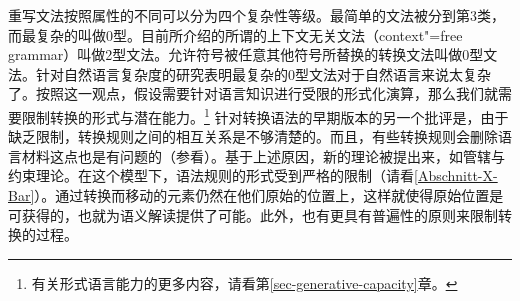重写文法按照属性的不同可以分为四个复杂性等级。最简单的文法被分到第3类，而最复杂的叫做0型。目前所介绍的所谓的上下文无关文法（context"=free grammar）叫做2型文法。允许符号被任意其他符号所替换的转换文法叫做0型文法\citep{PR73a-u}。\label{page-TG-Typ0}针对自然语言复杂度的研究表明最复杂的0型文法对于自然语言来说太复杂了。按照这一观点，假设需要针对语言知识进行受限的形式化演算\citep[]{Chomsky65a}，那么我们就需要限制转换的形式与潜在能力。\footnote{%
    有关形式语言能力的更多内容，请看第\ref{sec-generative-capacity}章。
} 
针对转换语法的早期版本的另一个批评是，由于缺乏限制，转换规则之间的相互关系是不够清楚的。而且，有些转换规则会删除语言材料这点也是有问题的（参看\citealp[\S~3.1.4]{Klenk2003a}）。基于上述原因，新的理论被提出来，如管辖与约束理论\citep{Chomsky81a}。在这个模型下，语法规则的形式受到严格的限制（请看\ref{Abschnitt-X-Bar}）。通过转换而移动的元素仍然在他们原始的位置上，这样就使得原始位置是可获得的，也就为语义解读提供了可能。此外，也有更具有普遍性的原则来限制转换的过程。

